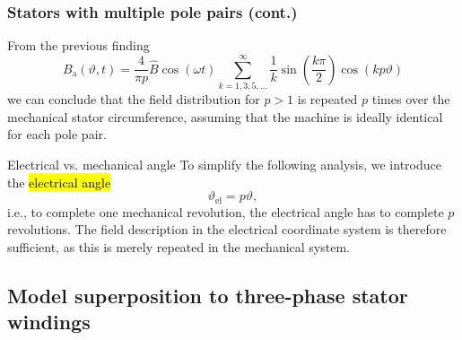 \begin{frame}
	\frametitle{Stators with multiple pole pairs (cont.)}
	From  the previous finding
	\begin{equation*}
		B_\mathrm{a}(\vartheta, t) = \frac{4}{\pi p} \hat{B} \cos(\omega t)\sum_{k=1,3,5,\ldots}^{\infty}   \frac{1}{k}\sin(\frac{k \pi}{2}) \cos(k p \vartheta)
	\end{equation*}
	we can conclude that the field distribution for $p > 1$ is repeated $p$ times over the mechanical stator circumference, assuming that the  machine is ideally identical for each pole pair.
	\pause
	\begin{varblock}{Electrical vs. mechanical angle}
		To simplify the following analysis, we introduce the \hl{electrical angle}
		\begin{equation}
			\vartheta_\mathrm{el} = p \vartheta,
		\end{equation}
		i.e., to complete one mechanical revolution, the electrical angle has to complete $p$ revolutions. The field description in the electrical coordinate system is therefore sufficient, as this is merely repeated in the mechanical system.
	\end{varblock}
\end{frame}

\subsection{Model superposition to three-phase stator windings}

